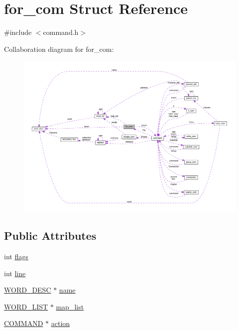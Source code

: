 \hypertarget{structfor__com}{}\section{for\+\_\+com Struct Reference}
\label{structfor__com}


{\ttfamily \#include $<$command.\+h$>$}



Collaboration diagram for for\+\_\+com\+:
\nopagebreak
\begin{figure}[H]
\begin{center}
\leavevmode
\includegraphics[width=350pt]{structfor__com__coll__graph}
\end{center}
\end{figure}
\subsection*{Public Attributes}
\begin{DoxyCompactItemize}
\item 
int \hyperlink{structfor__com_add9efd6ed9e84a42922fc7c6b273e3b9}{flags}
\item 
int \hyperlink{structfor__com_a268cba692dd4b85d33586df8286dcc6e}{line}
\item 
\hyperlink{command_8h_a3f0cccf333703e5f6c4168be0db675fa}{W\+O\+R\+D\+\_\+\+D\+E\+SC} $\ast$ \hyperlink{structfor__com_a954d92414437178eb2545211a43291db}{name}
\item 
\hyperlink{command_8h_ac42a7b781459884316a1f2ffe79e8a62}{W\+O\+R\+D\+\_\+\+L\+I\+ST} $\ast$ \hyperlink{structfor__com_ae9bc74158b6735a789842cbba12dea60}{map\+\_\+list}
\item 
\hyperlink{command_8h_a8c41dec142c299806885773c902c0d87}{C\+O\+M\+M\+A\+ND} $\ast$ \hyperlink{structfor__com_a8f50a2c1bfc84c589ce327839c5e4805}{action}
\end{DoxyCompactItemize}


